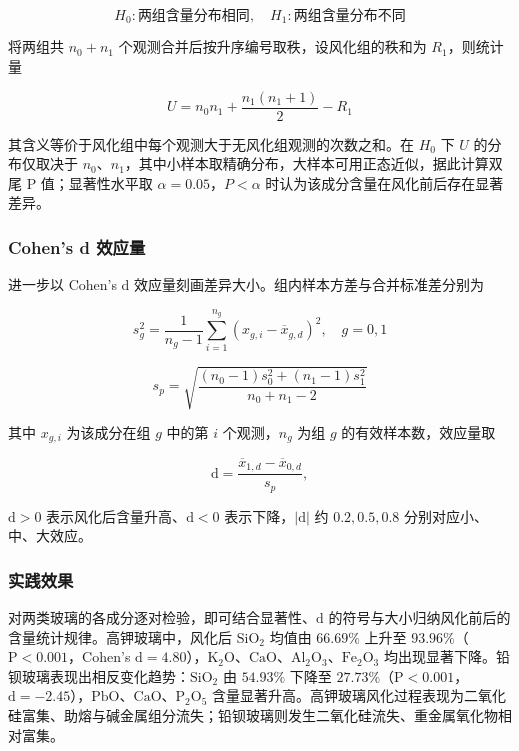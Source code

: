 \documentclass{ctexart}
\begin{document}
\begin{equation*}
H_{0}:\text{两组含量分布相同},\quad H_{1}:\text{两组含量分布不同}
\end{equation*}

将两组共 $n_{0}+n_{1}$ 个观测合并后按升序编号取秩，设风化组的秩和为 $R_{1}$，则统计量

\begin{equation*}
U=n_{0}n_{1}+\frac{n_{1}(n_{1}+1)}{2}-R_{1}
\end{equation*}

其含义等价于风化组中每个观测大于无风化组观测的次数之和。在 $H_0$ 下 $U$ 的分布仅取决于 $n_{0}$、$n_{1}$，其中小样本取精确分布，大样本可用正态近似，据此计算双尾 P 值；显著性水平取 $\alpha=0.05$，$P<\alpha$ 时认为该成分含量在风化前后存在显著差异。


\subsubsection{Cohen's d 效应量}

进一步以 Cohen's d 效应量刻画差异大小。组内样本方差与合并标准差分别为

\begin{equation*}
s_{g}^{2}=\frac{1}{n_{g}-1}\sum_{i=1}^{n_{g}}(x_{g,i}-\overline{x}_{g,d})^{2},\quad g=0,1
\end{equation*}

\begin{equation*}
s_{p}=\sqrt{\frac{(n_{0}-1)s_{0}^{2}+(n_{1}-1)s_{1}^{2}}{n_{0}+n_{1}-2}}
\end{equation*}

其中 $x_{g,i}$ 为该成分在组 $g$ 中的第 $i$ 个观测，$n_g$ 为组 $g$ 的有效样本数，效应量取

\begin{equation*}
\mathrm{d}=\frac{\overline{x}_{1,d}-\overline{x}_{0,d}}{s_{p}},
\end{equation*}

$\mathrm{d}>0$ 表示风化后含量升高、$\mathrm{d}<0$ 表示下降，$|\mathrm{d}|$ 约 $0.2,0.5,0.8$ 分别对应小、中、大效应。

\subsubsection{实践效果}

对两类玻璃的各成分逐对检验，即可结合显著性、$\mathrm{d}$ 的符号与大小归纳风化前后的含量统计规律。高钾玻璃中，风化后 $\mathrm{SiO_2}$ 均值由 $66.69\%$ 上升至 $93.96\%$（$\mathrm{P}<0.001$，Cohen's $\mathrm{d}=4.80$），$\mathrm{K_2O}$、$\mathrm{\mathrm{CaO}}$、$\mathrm{Al_2O_3}$、$\mathrm{Fe_2O_3}$ 均出现显著下降。铅钡玻璃表现出相反变化趋势：$\mathrm{SiO_2}$ 由 $54.93\%$ 下降至 $27.73\%$（$\mathrm{P}<0.001$，$\mathrm{d}=-2.45$），$\mathrm{\mathrm{PbO}}$、$\mathrm{\mathrm{CaO}}$、$\mathrm{P_2O_5}$ 含量显著升高。高钾玻璃风化过程表现为二氧化硅富集、助熔与碱金属组分流失；铅钡玻璃则发生二氧化硅流失、重金属氧化物相对富集。
\end{document}
